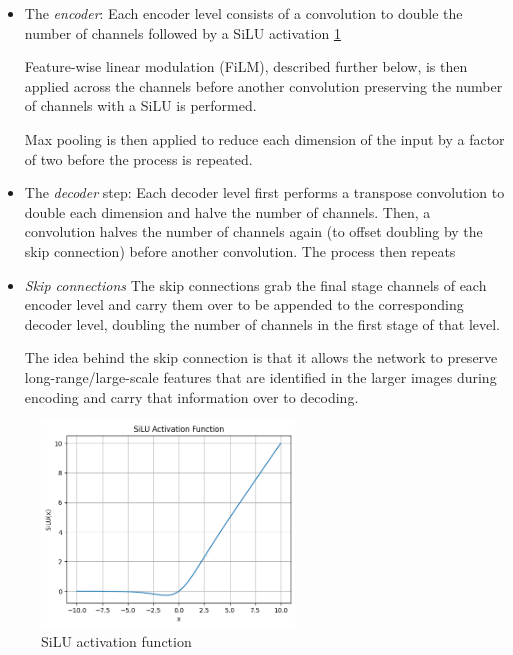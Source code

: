 \documentclass[12pt]{article}
\begin{document}
\begin{itemize}
	\item The \textit{encoder}: Each encoder level consists of a convolution to double the number of channels followed
	by a SiLU activation \ref{fig:silu}
	
	Feature-wise linear modulation (FiLM), described further below, is then applied
	across the channels before another convolution preserving the number of channels with a SiLU is performed.
	
	Max pooling is then applied to reduce each dimension of the input by a factor of two before the process is repeated.

	\item The \textit{decoder} step: Each decoder level first performs a transpose convolution to double each dimension and halve 
	the number of channels.
	Then, a convolution halves the number of channels again (to offset doubling by the skip connection) before another convolution. The process then repeats

	\item \textit{Skip connections} The skip connections grab the final stage channels of each encoder level and carry them over
	to be appended to the corresponding decoder level, doubling the number of channels in the first stage of that level.

	The idea behind the skip connection is that it allows the network to preserve long-range/large-scale features that are identified
	in the larger images during encoding and carry that information over to decoding. 
\end{itemize}

\begin{figure}
	\begin{center}
	\includegraphics[width=0.6\textwidth]{figures/SiLU.png}
	\end{center}
	\caption[SiLU Activation]{SiLU activation function}
	\label{fig:silu}
\end{figure}
\end{document}

